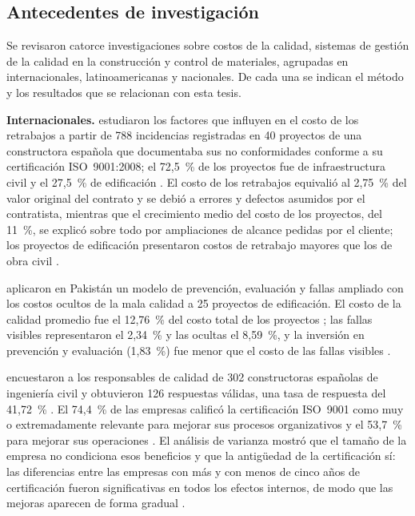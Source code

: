 \subsection{Antecedentes de investigación}

Se revisaron catorce investigaciones sobre costos de la calidad, sistemas de gestión de la calidad en la construcción y control de materiales, agrupadas en internacionales, latinoamericanas y nacionales. De cada una se indican el método y los resultados que se relacionan con esta tesis.

\textbf{Internacionales.} \textcite{forcada2017} estudiaron los factores que influyen en el costo de los retrabajos a partir de 788 incidencias registradas en 40 proyectos de una constructora española que documentaba sus no conformidades conforme a su certificación ISO~9001:2008; el 72,5~\% de los proyectos fue de infraestructura civil y el 27,5~\% de edificación \parencite[pp.~1, 4, 6]{forcada2017}. El costo de los retrabajos equivalió al 2,75~\% del valor original del contrato y se debió a errores y defectos asumidos por el contratista, mientras que el crecimiento medio del costo de los proyectos, del 11~\%, se explicó sobre todo por ampliaciones de alcance pedidas por el cliente; los proyectos de edificación presentaron costos de retrabajo mayores que los de obra civil \parencite[pp.~8, 10, 16]{forcada2017}.

\textcite{khadim2023} aplicaron en Pakistán un modelo de prevención, evaluación y fallas ampliado con los costos ocultos de la mala calidad a 25 proyectos de edificación. El costo de la calidad promedio fue el 12,76~\% del costo total de los proyectos \parencite[p.~5423]{khadim2023}; las fallas visibles representaron el 2,34~\% y las ocultas el 8,59~\%, y la inversión en prevención y evaluación (1,83~\%) fue menor que el costo de las fallas visibles \parencite[pp.~5420--5421]{khadim2023}.

\textcite{pradoroman2018} encuestaron a los responsables de calidad de 302 constructoras españolas de ingeniería civil y obtuvieron 126 respuestas válidas, una tasa de respuesta del 41,72~\% \parencite[pp.~150, 157]{pradoroman2018}. El 74,4~\% de las empresas calificó la certificación ISO~9001 como muy o extremadamente relevante para mejorar sus procesos organizativos y el 53,7~\% para mejorar sus operaciones \parencite[p.~163]{pradoroman2018}. El análisis de varianza mostró que el tamaño de la empresa no condiciona esos beneficios y que la antigüedad de la certificación sí: las diferencias entre las empresas con más y con menos de cinco años de certificación fueron significativas en todos los efectos internos, de modo que las mejoras aparecen de forma gradual \parencite[pp.~161--162, 164]{pradoroman2018}.

